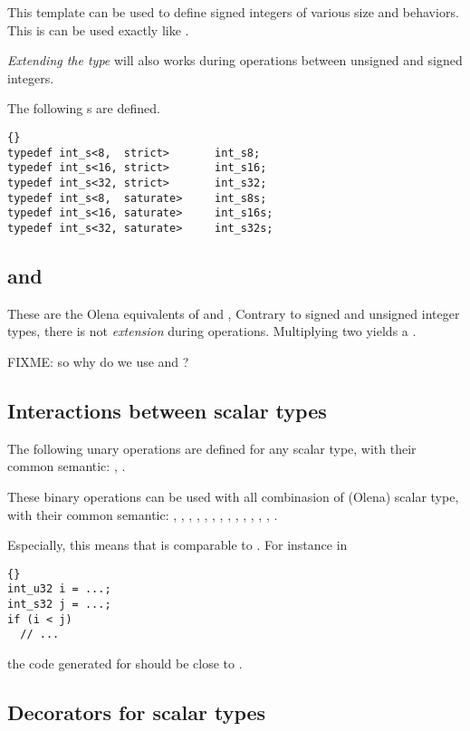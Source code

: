 This template can be used to define signed integers of various size
and behaviors.  This is can be used exactly like
.

\emph{Extending the type} will also works during operations between
unsigned and signed integers.

The following s are defined.
\begin{lstlisting}{}
typedef int_s<8,  strict>       int_s8;
typedef int_s<16, strict>       int_s16;
typedef int_s<32, strict>       int_s32;
typedef int_s<8,  saturate>     int_s8s;
typedef int_s<16, saturate>     int_s16s;
typedef int_s<32, saturate>     int_s32s;
\end{lstlisting}

\subsection{ and }

These are the Olena equivalents of  and ,
Contrary to signed and unsigned integer types, there is not
\emph{extension} during operations.  Multiplying two 
yields a .

FIXME: so why do we use  and ?

\subsection{Interactions between scalar types}

The following unary operations are defined for any scalar type, with
their common semantic:
, .

These binary operations can be used with all combinasion of (Olena)
scalar type, with their common semantic: , ,
, , , , ,
, , , , , , .

Especially, this means that  is comparable to
.  For instance in
\begin{lstlisting}{}
int_u32 i = ...;
int_s32 j = ...;
if (i < j)
  // ...
\end{lstlisting}
the code generated for  should be close to
.

\subsection{Decorators for scalar types}

